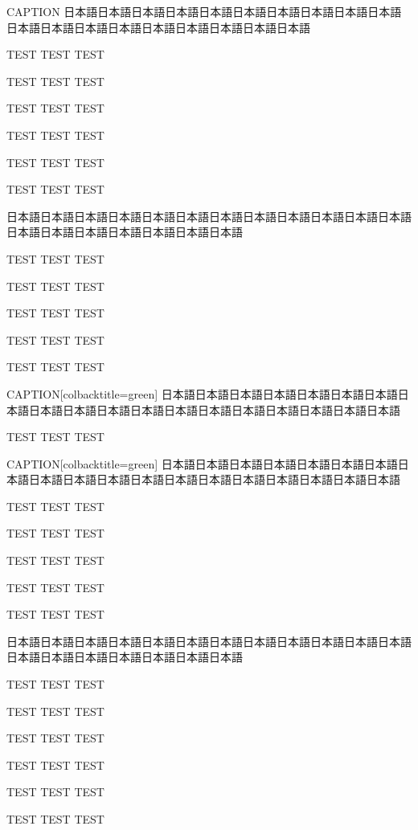\clearpage

\begin{rv@folderbox@caption}{CAPTION}
日本語日本語日本語日本語日本語日本語日本語日本語日本語日本語日本語日本語日本語日本語日本語日本語日本語日本語日本語

TEST TEST TEST

TEST TEST TEST

TEST TEST TEST

TEST TEST TEST

TEST TEST TEST

TEST TEST TEST

\end{rv@folderbox@caption}

\begin{rv@folderbox@nocaption}
日本語日本語日本語日本語日本語日本語日本語日本語日本語日本語日本語日本語日本語日本語日本語日本語日本語日本語日本語

TEST TEST TEST

TEST TEST TEST

TEST TEST TEST

TEST TEST TEST

TEST TEST TEST

\end{rv@folderbox@nocaption}

\clearpage

\begin{rv@clipbox@caption}{CAPTION}[colbacktitle=green]
日本語日本語日本語日本語日本語日本語日本語日本語日本語日本語日本語日本語日本語日本語日本語日本語日本語日本語日本語

TEST TEST TEST

\end{rv@clipbox@caption}

\begin{rv@clipbox@caption}{CAPTION}[colbacktitle=green]
日本語日本語日本語日本語日本語日本語日本語日本語日本語日本語日本語日本語日本語日本語日本語日本語日本語日本語日本語

TEST TEST TEST

TEST TEST TEST

TEST TEST TEST

TEST TEST TEST

TEST TEST TEST

\end{rv@clipbox@caption}

\begin{rv@clipbox@nocaption}
日本語日本語日本語日本語日本語日本語日本語日本語日本語日本語日本語日本語日本語日本語日本語日本語日本語日本語日本語

TEST TEST TEST

TEST TEST TEST

TEST TEST TEST

TEST TEST TEST

TEST TEST TEST

TEST TEST TEST

\end{rv@clipbox@nocaption}

